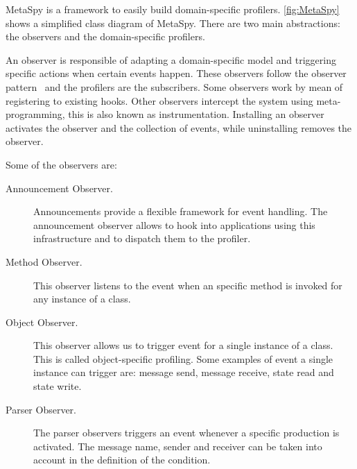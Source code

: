 \documentclass[runningheads]{llncs}
\newcommand{\project}{{\sc MetaSpy}\xspace}
\newcommand{\lr}[1]{\nb{Lukas}{orange}{#1}}
\begin{document}
\project is a framework to easily build domain-specific profilers. 
\autoref{fig:MetaSpy} shows a simplified class diagram of \project.
There are two main abstractions: the observers and the domain-specific profilers.

An observer is responsible of adapting a domain-specific model and triggering specific actions when certain events happen.
These observers follow the observer pattern~\cite{Gamm95a} and the profilers are the subscribers.
Some observers work by mean of registering to existing hooks. Other observers intercept the system using meta-programming, this is also known as instrumentation.
Installing an observer activates the observer and the collection of events, while uninstalling removes the observer. 


Some of the observers are:
\begin{description}
	\item[Announcement Observer.] Announcements provide a flexible framework for event handling. The announcement observer allows to hook into applications using this infrastructure and to dispatch them to the profiler.
	\item[Method Observer.] This observer listens to the event when an specific method is invoked for any instance of a class.
	\item[Object Observer.] This observer allows us to trigger event for a single instance of a class. This is called object-specific profiling. Some examples of event a single instance can trigger are: message send, message receive, state read and state write.
	\item[Parser Observer.] The parser observers triggers an event whenever a specific production is activated.
	The message name, sender and receiver can be taken into account in the definition of the condition. 
\end{description}
\end{document}
